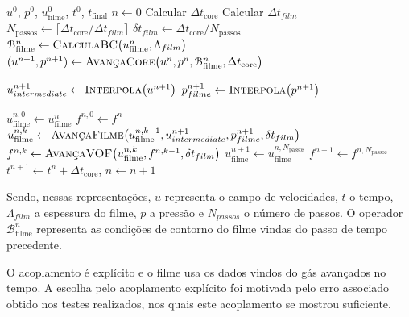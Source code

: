 \begin{algorithm}[H]
\caption{Sequência do algoritmo com subciclagem temporal do filme.}
\label{alg:sequencia-subciclagem}
\begin{algorithmic}[1]
\Require $u^0$, $p^0$, $u_\mathrm{filme}^0$, $t^0$, $t_\mathrm{final}$
\State $n \gets 0$
  \State Calcular $\Delta t_\mathrm{core}$
  \State Calcular $\Delta t_{film}$
  \State $N_\mathrm{passos} \gets \lceil \Delta t_\mathrm{core} / \Delta t_{film} \rceil$
  \State $\delta t_{film} \gets \Delta t_\mathrm{core} / N_\mathrm{passos}$
  \State $\mathcal{B}_\mathrm{filme}^{n} \gets \textsc{CalculaBC}\big(u_\mathrm{filme}^{n}, \Lambda_{film}\big)$
  \State $(u^{n+1}, p^{n+1}) \gets \textsc{AvançaCore}\big(u^{n}, p^{n}, \mathcal{B}_\mathrm{filme}^{n}, \Delta t_\mathrm{core}\big)$

  \State $u_{intermediate}^{n+1} \gets \textsc{Interpola}\big( u^{n+1}\big)$
  \State $p_{filme}^{n+1} \gets \textsc{Interpola}\big( p^{n+1}\big)$

  \State $u_\mathrm{filme}^{n,0} \gets u_\mathrm{filme}^{n}$
  \State $f^{n,0} \gets f^{n}$
    \State $u_\mathrm{filme}^{n,k} \gets \textsc{AvançaFilme}\big(u_\mathrm{filme}^{n,k-1}, u_{intermediate}^{n+1}, p_{filme}^{n+1}, \delta t_{film}\big)$
    \State $f^{n,k} \gets \textsc{AvançaVOF}\big(u_\mathrm{filme}^{n,k}, f^{n,k-1}, \delta t_{film}\big)$
  \EndFor
  \State $u_\mathrm{filme}^{n+1} \gets u_\mathrm{filme}^{n,N_\mathrm{passos}}$
  \State $f^{n+1} \gets f^{n,N_\mathrm{passos}}$
  \State $t^{n+1} \gets t^n + \Delta t_\mathrm{core}$, \quad $n \gets n+1$
\EndWhile
\end{algorithmic}
\end{algorithm}

Sendo, nessas representações, $u$ representa o campo de velocidades, $t$ o tempo, $\Lambda_{film}$ a espessura do filme, $p$ a pressão e $N_{passos}$ o número de passos. O operador $\mathcal{B}_\mathrm{filme}^{n}$ representa as condições de contorno do filme vindas do passo de tempo precedente.

O acoplamento é explícito e o filme usa os dados vindos do gás avançados no tempo. A escolha pelo acoplamento explícito foi motivada pelo erro associado obtido nos testes realizados, nos quais este acoplamento se mostrou suficiente.
